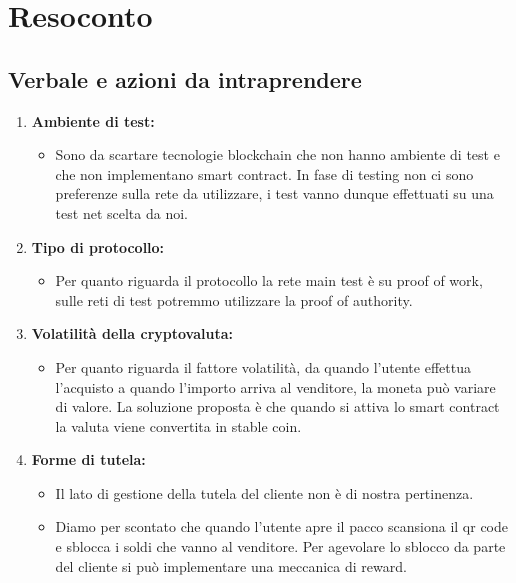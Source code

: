 \section{Resoconto}
\subsection{Verbale e azioni da intraprendere}

\begin{enumerate}
	\item \textbf{Ambiente di test:}
	\begin{itemize}
		\item Sono da scartare tecnologie blockchain\glo{} che non hanno ambiente di test e che non implementano smart contract\glo{}.
		In fase di testing non ci sono preferenze sulla rete da utilizzare, i test vanno dunque effettuati su una test net scelta da noi.
	\end{itemize}

	\item \textbf{Tipo di protocollo:}
	\begin{itemize}
		\item Per quanto riguarda il protocollo la rete main test è su proof of work\glo{}, sulle reti di test potremmo utilizzare la proof of authority\glo{}.
	\end{itemize}

	\item \textbf{Volatilità della cryptovaluta\glo:}
	\begin{itemize}
		\item Per quanto riguarda il fattore volatilità, da quando l'utente effettua l'acquisto a quando l'importo arriva al venditore, la moneta può variare di valore.
		 La soluzione proposta è che quando si attiva lo smart contract\glo{} la valuta viene convertita in stable coin\glo{}.
	\end{itemize}

	\item \textbf{Forme di tutela:}
	\begin{itemize}
		\item Il lato di gestione della tutela del cliente non è di nostra pertinenza.
		\item Diamo per scontato che quando l'utente apre il pacco scansiona il qr code\glo{} e sblocca i soldi che vanno al venditore.
		 Per agevolare lo sblocco da parte del cliente si può implementare una meccanica di reward.
	\end{itemize}


\end{enumerate}
